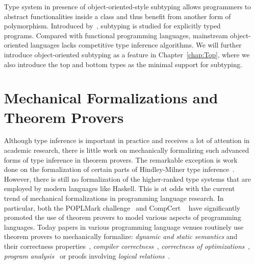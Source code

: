 Type system in presence of object-oriented-style subtyping allows
programmers to abstract functionalities inside a class
and thus benefit from another form of polymorphism.
Introduced by~\citet{Mitchell1984,Reynolds1985,Cardelli1988},
subtyping is studied for explicitly typed programs.
Compared with functional programming languages,
mainstream object-oriented languages lacks competitive type inference algorithms.
We will further introduce object-oriented subtyping as a feature in Chapter~\ref{chap:Top},
where we also introduce the top and bottom types as the minimal support for subtyping.

\section{Mechanical Formalizations and Theorem Provers}

Although type inference is important in practice and
receives a lot of attention in
academic research, there is little work on mechanically formalizing
such advanced forms of type inference in theorem provers.
The remarkable exception is work done on the formalization of 
certain parts of Hindley-Milner type inference~\citep{naraschewski1999type,
dubois2000proving,dubois1999certification,urban2008nominal,
garrigue2015certified}. However,
there is still no formalization of the higher-ranked type systems
that are employed by modern languages like Haskell.
This is at
odds with the current trend of mechanical formalizations in
programming language research. In particular, both the POPLMark
challenge~\citep{aydemir2005mechanized} and
CompCert ~\citep{leroy2012compcert} have significantly promoted
the use of theorem provers to model various aspects of programming
languages. Today papers in various programming language venues routinely
use theorem provers to mechanically formalize: \emph{dynamic and
  static semantics} and their correctness properties~\citep{aydemir2008engineering},
\emph{compiler correctness}~\citep{leroy2012compcert}, \emph{correctness of
  optimizations}~\citep{Bertot04}, \emph{program analysis}~\citep{Chang2006}
or proofs involving \emph{logical relations}~\citep{abel2018}.

